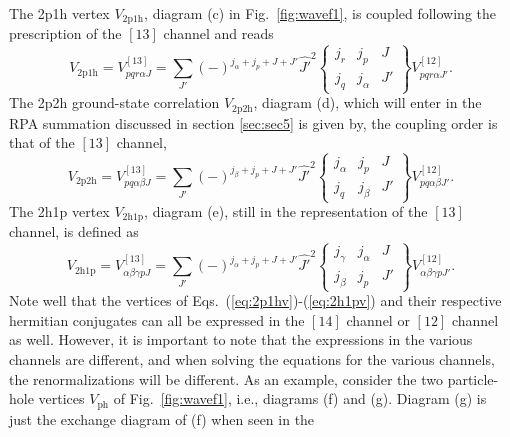 \documentclass{article}
\begin{document}
The 2p1h vertex $V_{\mathrm{2p1h}}$,
diagram (c) in  Fig.\  \ref{fig:wavef1},
is coupled
following the prescription of the $[13]$ channel and reads
\begin{equation}
      V_{\mathrm{2p1h}}=V_{pqr\alpha J}^{[13]}=
      {\displaystyle \sum_{J'}}(-)^{j_{\alpha}+j_p+J+J'}\hat{J'}^2
      \left\{
      \begin{array}{ccc}
       j_r&j_p&J\\j_q&j_{\alpha}&J'
      \end{array}
       \right\}
       V_{pqr\alpha J'}^{[12]}.
       \label{eq:2p1hv}
\end{equation}
The 2p2h ground-state correlation $V_{\mathrm{2p2h}}$, diagram (d),
 which will enter
in the RPA summation discussed in section \ref{sec:sec5} is given by,
the coupling order is that of the $[13]$ channel,
\begin{equation}
      V_{\mathrm{2p2h}}=V_{pq\alpha\beta J}^{[13]}=
      {\displaystyle \sum_{J'}}(-)^{j_{\beta}+j_p+J+J'}\hat{J'}^2
      \left\{
      \begin{array}{ccc}
       j_{\alpha}&j_p&J\\j_q&j_{\beta}&J'
      \end{array}
       \right\}
       V_{pq\alpha\beta J'}^{[12]}.
       \label{eq:2p2hv}
\end{equation}
The 2h1p vertex $V_{\mathrm{2h1p}}$, diagram (e),
still in the representation of
the $[13]$ channel, is defined as
\begin{equation}
      V_{\mathrm{2h1p}}=V_{\alpha\beta\gamma p J}^{[13]}=
      {\displaystyle \sum_{J'}}(-)^{j_{\alpha}+j_p+J+J'}\hat{J'}^2
      \left\{
      \begin{array}{ccc}
       j_{\gamma}&j_{\alpha}&J\\j_{\beta}&j_p&J'
      \end{array}
       \right\}
       V_{\alpha\beta\gamma p J'}^{[12]}.
       \label{eq:2h1pv}
\end{equation}
Note well that the vertices of Eqs.\ (\ref{eq:2p1hv})-(\ref{eq:2h1pv})
and their respective
hermitian conjugates can all be expressed in the $[14]$ channel
or $[12]$ channel as well.
However, it is important to note that the expressions in the various
channels are different, and when solving the equations for the various
channels, the renormalizations will be different. As an example, consider
the two particle-hole vertices $V_{\mathrm{ph}}$
of Fig.\ \ref{fig:wavef1}, i.e., diagrams (f) and (g).
Diagram (g) is just the exchange diagram of (f) when seen in the
\end{document}
